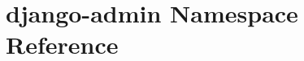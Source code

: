\hypertarget{namespacedjango-admin}{\section{django-\/admin Namespace Reference}
\label{namespacedjango-admin}
}
